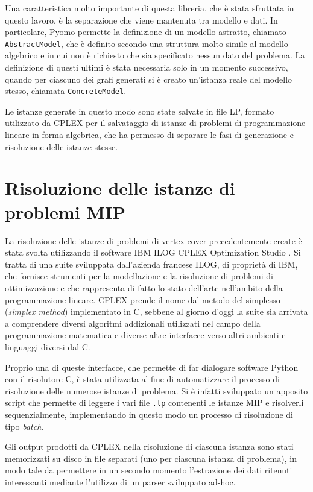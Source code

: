 Una caratteristica molto importante di questa libreria, che è stata sfruttata in questo lavoro, è la separazione che viene mantenuta tra modello e dati.
In particolare, Pyomo permette la definizione di un modello astratto, chiamato \texttt{AbstractModel}, che è definito secondo una struttura molto simile al modello algebrico e in cui non è richiesto che sia specificato nessun dato del problema. La definizione di questi ultimi è stata necessaria solo in un momento successivo, quando per ciascuno dei grafi generati si è creato un'istanza reale del modello stesso, chiamata \texttt{ConcreteModel}.

Le istanze generate in questo modo sono state salvate in file LP, formato utilizzato da CPLEX per il salvataggio di istanze di problemi di programmazione lineare in forma algebrica, che ha permesso di separare le fasi di generazione e risoluzione delle istanze stesse.



\section{Risoluzione delle istanze di problemi MIP}
La risoluzione delle istanze di problemi di vertex cover precedentemente create è stata svolta utilizzando il software IBM ILOG CPLEX Optimization Studio \cite{cplex}. Si tratta di una suite sviluppata dall'azienda francese ILOG, di proprietà di IBM, che fornisce strumenti per la modellazione e la risoluzione di problemi di ottimizzazione e che rappresenta di fatto lo stato dell'arte nell'ambito della programmazione lineare. CPLEX prende il nome dal metodo del simplesso (\textit{simplex method}) implementato in C, sebbene al giorno d'oggi la suite sia arrivata a comprendere diversi algoritmi addizionali utilizzati nel campo della programmazione matematica e diverse altre interfacce verso altri ambienti e linguaggi diversi dal C.  

Proprio una di queste interfacce,  che permette di far dialogare software Python con il risolutore C, è stata utilizzata al fine di automatizzare il processo di risoluzione delle numerose istanze di problema. Si è infatti sviluppato un apposito script che permette di leggere i vari file \texttt{.lp} contenenti le istanze MIP e risolverli sequenzialmente, implementando in questo modo un processo di risoluzione di tipo \textit{batch}. 

Gli output prodotti da CPLEX nella risoluzione di ciascuna istanza sono stati memorizzati su disco in file separati (uno per ciascuna istanza di problema), in modo tale da permettere in un secondo momento l'estrazione dei dati ritenuti interessanti mediante l'utilizzo di un parser sviluppato ad-hoc. 

